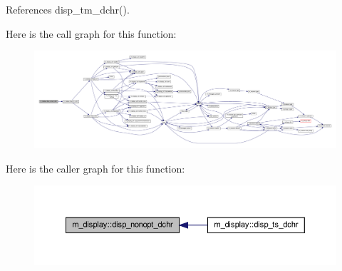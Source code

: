 References disp\+\_\+tm\+\_\+dchr().

Here is the call graph for this function\+:
\nopagebreak
\begin{figure}[H]
\begin{center}
\leavevmode
\includegraphics[width=350pt]{namespacem__display_a12b5831082d636bdab23dbc7c1ddb879_cgraph}
\end{center}
\end{figure}
Here is the caller graph for this function\+:
\nopagebreak
\begin{figure}[H]
\begin{center}
\leavevmode
\includegraphics[width=350pt]{namespacem__display_a12b5831082d636bdab23dbc7c1ddb879_icgraph}
\end{center}
\end{figure}
\mbox{\label{namespacem__display_ae8bac9197ad0a43b71cd5e43a0a20cec}} 
